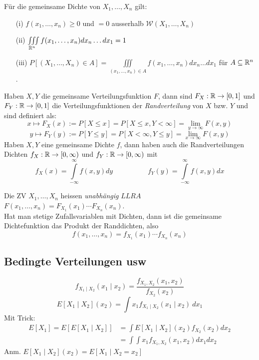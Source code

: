 \begin{korollar}
Für die gemeinsame Dichte von $X_1,\dots,X_n$ gilt:
\begin{itemize}
\item[(i)] $f(x_1,\dots, x_n) \geq 0$ und $=0$ ausserhalb $\mathcal{W}(X_1, \dots, X_n)$
\item[(ii)] $ \iiint \limits_{\mathbb{R}^n} f(x_1, \dots, x_n) dx_n \dots dx_1 = 1$
\item[(iii)] $P[(X_1,\dots, X_n) \in A] = \iiint \limits_{(x_1,\dots,x_n) \in A} f(x_1, \dots, x_n) dx_n \dots dx_1$ für $A\subseteq \mathbb{R}^n$.
\end{itemize}
\end{korollar}

\begin{definition}
Haben $X,Y$ die gemeinsame Verteilungsfunktion $F$, dann sind $F_X:\mathbb{R}\to[0,1]$ und $F_Y:\mathbb{R}\to[0,1]$ die Verteilungsfunktionen der \textit{Randverteilung} von $X$ bzw. $Y$ und sind definiert als:
$$ x \mapsto F_X(x) := P[X \leq x] = P[X \leq x, Y < \infty] = \lim_{y\to \infty} F(x,y)$$
$$ y \mapsto F_Y(y) := P[Y \leq y] = P[X < \infty, Y \leq y] = \lim_{x\to \infty} F(x,y)$$
Haben $X,Y$ eine gemeinsame Dichte $f$, dann haben auch die Randverteilungen Dichten $f_X:\mathbb{R}\to [0, \infty)$ und $f_Y:\mathbb{R} \to [0, \infty)$ mit
$$ f_X(x) = \int\limits_{-\infty}^{\infty} f(x,y) dy \quad \quad \quad \quad \quad f_Y(y) = \int \limits_{-\infty}^{\infty} f(x,y) dx$$
\end{definition}

\begin{definition}
Die ZV $X_1,\dots,X_n$ heissen \textit{unabhängig} $LLRA$ $F(x_1,\dots,x_n) = F_{X_1}(x_1) \cdots F_{X_n}(x_n)$.\\
Hat man stetige Zufallsvariablen mit Dichten, dann ist die gemeinsame Dichtefunktion das Produkt der Randdichten, also
$$ f(x_1, \dots, x_n) = f_{X_1}(x_1) \cdots f_{X_n}(x_n)$$
\end{definition}

\subsection{Bedingte Verteilungen usw}

\begin{definition}

$$ f_{X_1 \mid X_2}(x_1\mid x_2) = \frac{f_{X_1, X_2}(x_1, x_2)}{f_{X_2}(x_2)}$$
$$ E[X_1 \mid X_2](x_2) = \int x_1 f_{X_1 \mid X_2}(x_1\mid x_2)\ dx_1$$
Mit Trick:
\begin{align*}
	E[X_1] = E[E[X_1 \mid X_2]] &= \int E[X_1 \mid X_2](x_2) f_{X_2}(x_2) dx_2\\
	&=\int \int x_1 f_{X_1, X_2}(x_1, x_2) dx_1 dx_2
\end{align*}
Anm. $E[X_1 \mid X_2](x_2) = E[X_1 \mid X_2=x_2]$ 
\end{definition}


